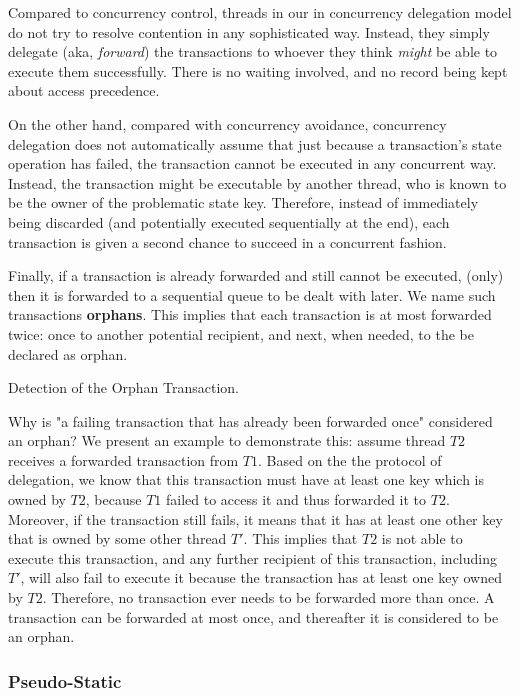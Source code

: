 Compared to concurrency control, threads in our in concurrency delegation model do not try to
resolve contention in any sophisticated way. Instead, they simply delegate (aka, \textit{forward})
the transactions to whoever they think \textit{might} be able to execute them successfully. There is
no waiting involved, and no record being kept about access precedence.

On the other hand, compared with concurrency avoidance, concurrency delegation does not
automatically assume that just because a transaction's state operation has failed, the transaction
cannot be executed in any concurrent way. Instead, the transaction might be executable by another
thread, who is known to be the owner of the problematic state key. Therefore, instead of immediately
being discarded (and potentially executed sequentially at the end), each transaction is given a
second chance to succeed in a concurrent fashion.

Finally, if a transaction is already forwarded and still cannot be executed, (only) then it is
forwarded to a sequential queue to be dealt with later. We name such transactions \textbf{orphans}.
This implies that each transaction is at most forwarded twice: once to another potential recipient,
and next, when needed, to the be declared as orphan.

\begin{lemma}
	Detection of the Orphan Transaction.

	Why is "a failing transaction that has already been forwarded once" considered an orphan? We
	present an example to demonstrate this: assume thread $T2$ receives a forwarded transaction from
	$T1$. Based on the the protocol of delegation, we know that this transaction must have at least
	one key which is owned by $T2$, because $T1$ failed to access it and thus forwarded it to $T2$.
	Moreover, if the transaction still fails, it means that it has at least one other key that is
	owned by some other thread $T'$. This implies that $T2$ is not able to execute this
	transaction, and any further recipient of this transaction, including $T'$, will also fail to
	execute it because the transaction has at least one key owned by $T2$. Therefore, no transaction
	ever needs to be forwarded more than once. A transaction can be forwarded at most once, and
	thereafter it is considered to be an orphan.
\end{lemma}

\subsubsection{Pseudo-Static}

